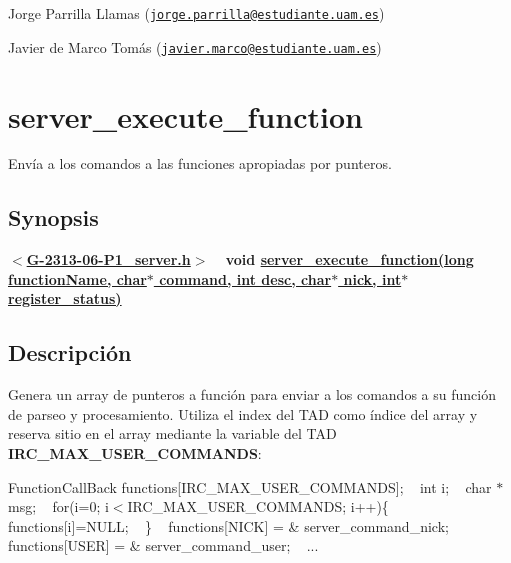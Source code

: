 \begin{DoxyItemize}
\item Jorge Parrilla Llamas (\href{mailto:jorge.parrilla@estudiante.uam.es}{\tt jorge.\+parrilla@estudiante.\+uam.\+es}) 
\item Javier de Marco Tomás (\href{mailto:javier.marco@estudiante.uam.es}{\tt javier.\+marco@estudiante.\+uam.\+es}) 
\end{DoxyItemize}\hypertarget{server_execute_function}{}\section{server\+\_\+execute\+\_\+function}\label{server_execute_function}
Envía a los comandos a las funciones apropiadas por punteros.\hypertarget{server_execute_function_synopsis5}{}\subsection{Synopsis}\label{server_execute_function_synopsis5}
{ {\bfseries $<$\hyperlink{G-2313-06-P1__server_8h}{G-\/2313-\/06-\/\+P1\+\_\+server.\+h}$>$} ~\newline
 {\bfseries void \hyperlink{G-2313-06-P1__server_8c_a775161328c3264fb8f96981f7a9c83ae}{server\+\_\+execute\+\_\+function(long function\+Name, char$\ast$ command, int desc, char$\ast$ nick, int$\ast$ register\+\_\+status)}} } \hypertarget{server_execute_function_descripcion5}{}\subsection{Descripción}\label{server_execute_function_descripcion5}
Genera un array de punteros a función para enviar a los comandos a su función de parseo y procesamiento. Utiliza el index del T\+A\+D como índice del array y reserva sitio en el array mediante la variable del T\+A\+D {\bfseries I\+R\+C\+\_\+\+M\+A\+X\+\_\+\+U\+S\+E\+R\+\_\+\+C\+O\+M\+M\+A\+N\+D\+S}\+:

{\ttfamily  Function\+Call\+Back functions\mbox{[}I\+R\+C\+\_\+\+M\+A\+X\+\_\+\+U\+S\+E\+R\+\_\+\+C\+O\+M\+M\+A\+N\+D\+S\mbox{]}; ~\newline
int i; ~\newline
char $\ast$msg; ~\newline
for(i=0; i$<$I\+R\+C\+\_\+\+M\+A\+X\+\_\+\+U\+S\+E\+R\+\_\+\+C\+O\+M\+M\+A\+N\+D\+S; i++)\{ ~\newline
 functions\mbox{[}i\mbox{]}=N\+U\+L\+L; ~\newline
\} ~\newline
functions\mbox{[}N\+I\+C\+K\mbox{]} = \& server\+\_\+command\+\_\+nick; ~\newline
functions\mbox{[}U\+S\+E\+R\mbox{]} = \& server\+\_\+command\+\_\+user; ~\newline
...} 

